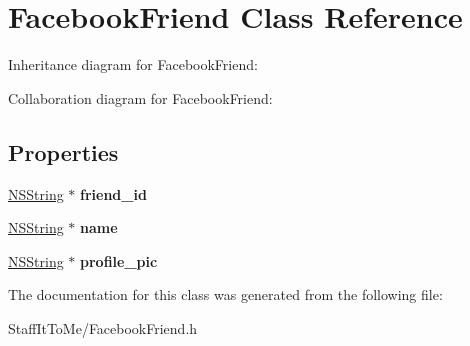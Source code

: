 \hypertarget{interface_facebook_friend}{
\section{\-Facebook\-Friend \-Class \-Reference}
\label{interface_facebook_friend}
}


\-Inheritance diagram for \-Facebook\-Friend\-:


\-Collaboration diagram for \-Facebook\-Friend\-:
\subsection*{\-Properties}
\begin{DoxyCompactItemize}
\item 
\hypertarget{interface_facebook_friend_ae38ce3617df15538db1aa31bc297c953}{
\hyperlink{class_n_s_string}{\-N\-S\-String} $\ast$ {\bfseries friend\-\_\-id}}
\label{interface_facebook_friend_ae38ce3617df15538db1aa31bc297c953}

\item 
\hypertarget{interface_facebook_friend_aa235e140df8e378f4adc8f98fb321ed7}{
\hyperlink{class_n_s_string}{\-N\-S\-String} $\ast$ {\bfseries name}}
\label{interface_facebook_friend_aa235e140df8e378f4adc8f98fb321ed7}

\item 
\hypertarget{interface_facebook_friend_a752099c5abd7f4805c669ebf1b62ca53}{
\hyperlink{class_n_s_string}{\-N\-S\-String} $\ast$ {\bfseries profile\-\_\-pic}}
\label{interface_facebook_friend_a752099c5abd7f4805c669ebf1b62ca53}

\end{DoxyCompactItemize}


\-The documentation for this class was generated from the following file\-:\begin{DoxyCompactItemize}
\item 
\-Staff\-It\-To\-Me/\-Facebook\-Friend.\-h\end{DoxyCompactItemize}
